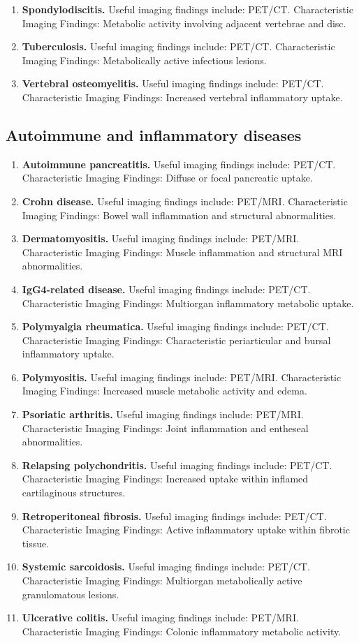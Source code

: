 \begin{enumerate}[leftmargin=*,itemsep=0.45em,topsep=0.4em]
\item \textbf{Spondylodiscitis.} Useful imaging findings include: PET/CT. Characteristic Imaging Findings: Metabolic activity involving adjacent vertebrae and disc.
\item \textbf{Tuberculosis.} Useful imaging findings include: PET/CT. Characteristic Imaging Findings: Metabolically active infectious lesions.
\item \textbf{Vertebral osteomyelitis.} Useful imaging findings include: PET/CT. Characteristic Imaging Findings: Increased vertebral inflammatory uptake.
\end{enumerate}

\subsection{Autoimmune and inflammatory diseases}
\begin{enumerate}[leftmargin=*,itemsep=0.45em,topsep=0.4em]
\item \textbf{Autoimmune pancreatitis.} Useful imaging findings include: PET/CT. Characteristic Imaging Findings: Diffuse or focal pancreatic uptake.
\item \textbf{Crohn disease.} Useful imaging findings include: PET/MRI. Characteristic Imaging Findings: Bowel wall inflammation and structural abnormalities.
\item \textbf{Dermatomyositis.} Useful imaging findings include: PET/MRI. Characteristic Imaging Findings: Muscle inflammation and structural MRI abnormalities.
\item \textbf{IgG4-related disease.} Useful imaging findings include: PET/CT. Characteristic Imaging Findings: Multiorgan inflammatory metabolic uptake.
\item \textbf{Polymyalgia rheumatica.} Useful imaging findings include: PET/CT. Characteristic Imaging Findings: Characteristic periarticular and bursal inflammatory uptake.
\item \textbf{Polymyositis.} Useful imaging findings include: PET/MRI. Characteristic Imaging Findings: Increased muscle metabolic activity and edema.
\item \textbf{Psoriatic arthritis.} Useful imaging findings include: PET/MRI. Characteristic Imaging Findings: Joint inflammation and entheseal abnormalities.
\item \textbf{Relapsing polychondritis.} Useful imaging findings include: PET/CT. Characteristic Imaging Findings: Increased uptake within inflamed cartilaginous structures.
\item \textbf{Retroperitoneal fibrosis.} Useful imaging findings include: PET/CT. Characteristic Imaging Findings: Active inflammatory uptake within fibrotic tissue.
\item \textbf{Systemic sarcoidosis.} Useful imaging findings include: PET/CT. Characteristic Imaging Findings: Multiorgan metabolically active granulomatous lesions.
\item \textbf{Ulcerative colitis.} Useful imaging findings include: PET/MRI. Characteristic Imaging Findings: Colonic inflammatory metabolic activity.
\end{enumerate}

